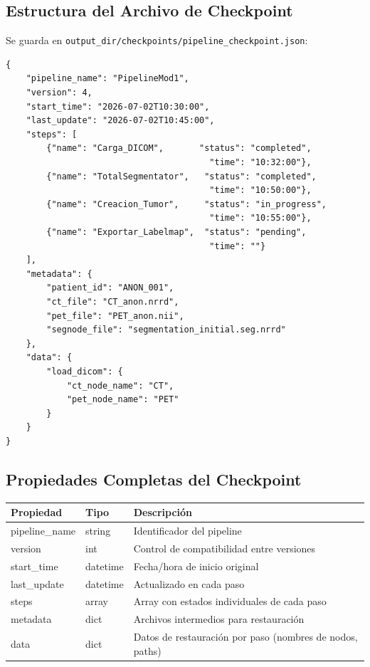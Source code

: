 \documentclass[12pt,a4paper]{article}
\begin{document}
\subsection{Estructura del Archivo de Checkpoint}

Se guarda en \texttt{output\_dir/checkpoints/pipeline\_checkpoint.json}:

\begin{lstlisting}
{
    "pipeline_name": "PipelineMod1",
    "version": 4,
    "start_time": "2026-07-02T10:30:00",
    "last_update": "2026-07-02T10:45:00",
    "steps": [
        {"name": "Carga_DICOM",       "status": "completed",
                                        "time": "10:32:00"},
        {"name": "TotalSegmentator",   "status": "completed",
                                        "time": "10:50:00"},
        {"name": "Creacion_Tumor",     "status": "in_progress",
                                        "time": "10:55:00"},
        {"name": "Exportar_Labelmap",  "status": "pending",
                                        "time": ""}
    ],
    "metadata": {
        "patient_id": "ANON_001",
        "ct_file": "CT_anon.nrrd",
        "pet_file": "PET_anon.nii",
        "segnode_file": "segmentation_initial.seg.nrrd"
    },
    "data": {
        "load_dicom": {
            "ct_node_name": "CT",
            "pet_node_name": "PET"
        }
    }
}
\end{lstlisting}

\subsection{Propiedades Completas del Checkpoint}

\begin{table}[H]
\centering
\begin{tabular}{l l l}
\toprule
\textbf{Propiedad} & \textbf{Tipo} & \textbf{Descripción} \\
\midrule
pipeline\_name & string & Identificador del pipeline \\
version & int & Control de compatibilidad entre versiones \\
start\_time & datetime & Fecha/hora de inicio original \\
last\_update & datetime & Actualizado en cada paso \\
steps & array & Array con estados individuales de cada paso \\
metadata & dict & Archivos intermedios para restauración \\
data & dict & Datos de restauración por paso (nombres de nodos, paths) \\
\bottomrule
\end{tabular}
\end{table}
\end{document}
